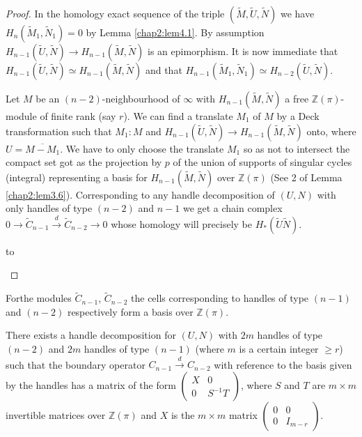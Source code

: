 \begin{proof}
In the homology exact sequence 
of the triple $(\tilde{M}, \tilde{U}, \tilde{N})$ we have $H_n
(\tilde{M}_1, \tilde{N}_1) = 0$ by Lemma \ref{chap2:lem4.1}. By assumption
$H_{n-1}(\tilde{U}, \tilde{N}) \to H_{n-1}(\tilde{M}, \tilde{N})$ is
an epimorphism. It is now immediate that $H_{n-1}(\tilde{U},
\tilde{N}) \simeq H_{n-1}(\tilde{M}, \tilde{N})$ and that
$H_{n-1}(\tilde{M}_1, \tilde{N}_1)\simeq H_{n-2} (\tilde{U},
\tilde{N})$. 

Let $M$ be an $(n-2)$-neighbourhood of $\infty$ with
$H_{n-1}(\tilde{M}, \tilde{N})$ a free $\mathbb{Z}(\pi)$-module of
finite rank (say $r$). We can find a translate $M_1$ of $M$ by a Deck
transformation such that $M_1: M$ and $H_{n-1} (\tilde{U},
\tilde{N}) \to H_{n-1} (\tilde{M}, \tilde{N})$ onto, where $U=
\overline{M-M_1}$. We have to only choose the translate $M_1$ so as
not to intersect the compact set got as the projection by $p$ of the
union of supports of singular cycles (integral) representing a basis
for $H_{n-1}(\tilde{M}, \tilde{N})$ over $\mathbb{Z}(\pi)$ (See 2 of
Lemma \ref{chap2:lem3.6}). Corresponding to any handle decomposition of $(U, N)$ with
only handles of type $(n-2)$ and $n-1$ we get a chain complex $0 \to
\tilde{C}_{n-1}\overset{d}\to \tilde{C}_{n-2} \to 0$ whose homology
will precisely be $H_* (\tilde{U} \tilde{N})$. 

\begin{landscape}
\vbox to
\end{landscape}
\end{proof}



For\pageoriginale the modules $\tilde{C}_{n-1}$, $\tilde{C}_{n-2}$ the
cells corresponding to handles of type $(n-1)$ and $(n-2)$
respectively form a basis over $\mathbb{Z}(\pi)$.   

\setcounter{prop}{4}
\begin{prop}\label{chap2:prop4.5}%
There exists a handle decomposition for $(U, N)$ with $2m$ handles of
type $(n-2)$ and $2m$ handles of type $(n-1)$ (where $m$ is a certain
integer $\geq r$) such that the boundary operator $C_{n-1}
\xrightarrow{d} C_{n-2}$ with reference to the basis given by the
handles has a matrix of the form $\left (\begin{smallmatrix} X &
  0\\ 0 &S^{-1} T \end{smallmatrix}\right)$, where $S$ and $T$ are $m
\times m$ invertible matrices over $\mathbb{Z}(\pi)$ and $X$ is the $m
\times m$ matrix $\left ( \begin{smallmatrix} 0& 0\\ 0&
  I_{m-r} \end{smallmatrix} \right)$. 
\end{prop}

